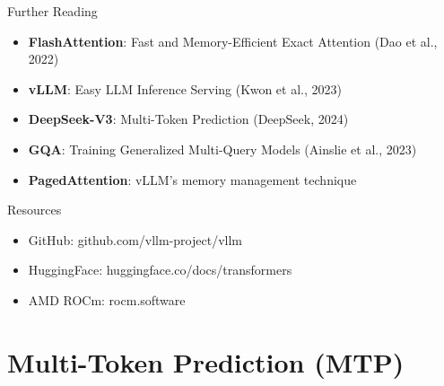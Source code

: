 \documentclass[aspectratio=169, 11pt]{beamer}
\begin{document}
\begin{frame}{Further Reading}

	\begin{itemize}
		\item \textbf{FlashAttention}: Fast and Memory-Efficient Exact Attention (Dao et al., 2022)
		\item \textbf{vLLM}: Easy LLM Inference Serving (Kwon et al., 2023)
		\item \textbf{DeepSeek-V3}: Multi-Token Prediction (DeepSeek, 2024)
		\item \textbf{GQA}: Training Generalized Multi-Query Models (Ainslie et al., 2023)
		\item \textbf{PagedAttention}: vLLM's memory management technique
	\end{itemize}

	\begin{block}{Resources}
		\begin{itemize}
			\item GitHub: github.com/vllm-project/vllm
			\item HuggingFace: huggingface.co/docs/transformers
			\item AMD ROCm: rocm.software
		\end{itemize}
	\end{block}

\end{frame}


\section{Multi-Token Prediction (MTP)}
\end{document}

